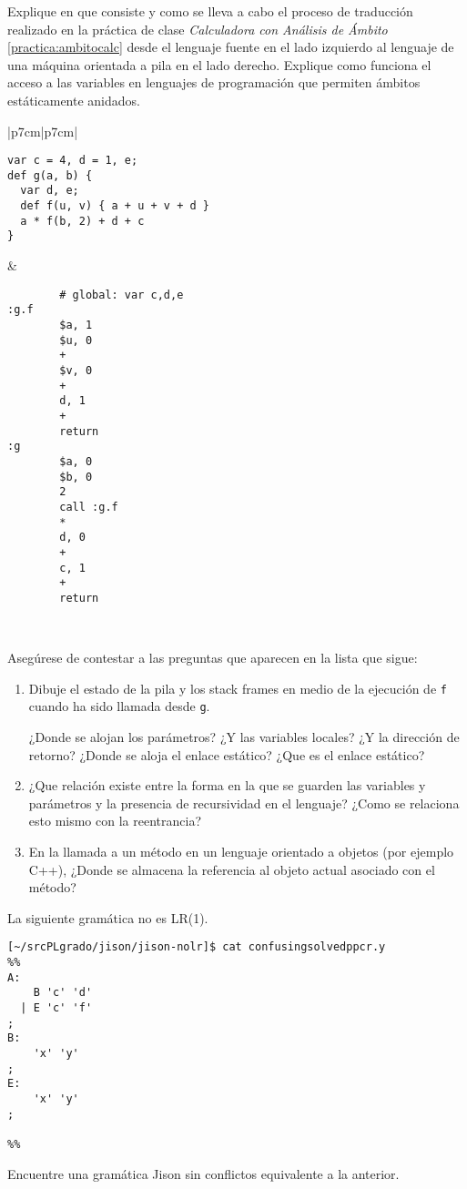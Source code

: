 \item
Explique  en que consiste y como se lleva a cabo
el proceso de traducción realizado en la práctica de
clase {\it Calculadora con Análisis de Ámbito}
\ref{practica:ambitocalc}
desde el lenguaje fuente en el lado izquierdo
al lenguaje de una máquina
orientada a pila en el lado derecho.
Explique como funciona el acceso a las variables 
en lenguajes de programación que permiten 
ámbitos estáticamente anidados.

\begin{tabular}{|p{7cm}|p{7cm}|}
\hline
\begin{verbatim}
var c = 4, d = 1, e;
def g(a, b) { 
  var d, e; 
  def f(u, v) { a + u + v + d }
  a * f(b, 2) + d + c 
}
\end{verbatim}
&
\begin{verbatim}
        # global: var c,d,e
:g.f
        $a, 1
        $u, 0
        +
        $v, 0
        +
        d, 1
        +
        return
:g
        $a, 0
        $b, 0
        2
        call :g.f
        *
        d, 0     
        +
        c, 1
        +
        return
\end{verbatim}\\
\hline
\end{tabular}

Asegúrese de contestar a las preguntas que aparecen en la lista que sigue:
\begin{enumerate}
\item 
Dibuje el estado de la pila y los stack frames
en medio de la ejecución de \verb|f| cuando ha sido llamada 
desde \verb|g|.

  ¿Donde se alojan los parámetros? ¿Y las variables locales? ¿Y la dirección de retorno?
  ¿Donde se aloja el enlace estático? ¿Que es el enlace estático?
  \item 
  ¿Que relación existe entre la forma en la que se guarden las variables y parámetros y la 
  presencia de recursividad en el lenguaje? ¿Como se relaciona esto mismo con la reentrancia?
  \item 
  En la llamada a un método en un lenguaje orientado a objetos 
  (por ejemplo C++), 
  ¿Donde se almacena la referencia al objeto actual asociado con el método?
\end{enumerate}


\item
La siguiente gramática no es LR(1).
\begin{verbatim}
[~/srcPLgrado/jison/jison-nolr]$ cat confusingsolvedppcr.y
%%
A: 
    B 'c' 'd' 
  | E 'c' 'f' 
;
B: 
    'x' 'y'
;
E: 
    'x' 'y' 
;

%%
\end{verbatim}
Encuentre una gramática Jison sin conflictos equivalente a la anterior.


